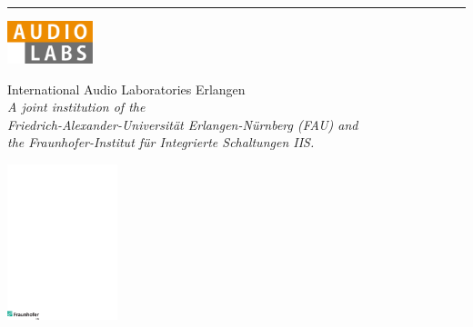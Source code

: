 \begin{titlepage}
\begin{localsize}{11}
\noindent\rule{\textwidth}{1pt}
\vspace{-1cm}
\begin{center}
\begin{minipage}[t]{2.6cm}
\vspace{0pt}
	\includegraphics[width=2.5cm]{figures/logos/Logo_AudioLabs.pdf}
\end{minipage}
\hfill
%
\begin{minipage}[t]{8.5cm}
\vspace{0pt}\sffamily{} 
\begin{center}
International Audio Laboratories Erlangen\\
\textit{\footnotesize A joint institution of the \vspace{-0.05cm}\\ 
Friedrich-Alexander-Universität Erlangen-Nürnberg (FAU) and \vspace{-0.15cm}\\
the Fraunhofer-Institut für Integrierte Schaltungen IIS.}
\end{center}
\end{minipage}
%
\hfill
\begin{minipage}[t]{3.3cm}
\vspace{0pt}
	\includegraphics[width=3.2cm]{figures/logos/Logo_IIS.pdf}
\end{minipage}
\end{center}


\end{localsize}
\end{titlepage} 

\restoregeometry
